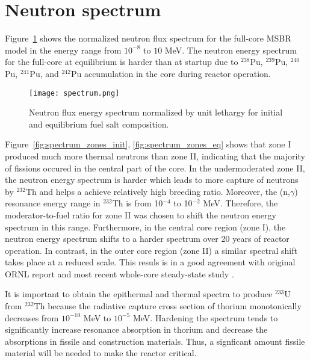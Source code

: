 \section{Neutron spectrum}
Figure~\ref{fig:spectrum} shows the normalized neutron flux spectrum for the full-core \gls{MSBR} model in the energy range from $10^{-8}$ to $10$ MeV. The neutron energy spectrum for the full-core at equilibrium is harder than at startup due to $^{238}$Pu, $^{239}$Pu, $^{240}$Pu, $^{241}$Pu, and $^{242}$Pu accumulation in the core during reactor operation. 

\begin{figure}[htp!] %
  \centering
    \vspace{-0.3em}
  \texttt{[image: spectrum.png]} 
  \caption{Neutron flux energy spectrum normalized by unit lethargy for initial and equilibrium fuel salt composition.}
    \vspace{-0.6em}
  \label{fig:spectrum}
\end{figure}
\FloatBarrier

Figure~\ref{fig:spectrum_zones_init}, \ref{fig:spectrum_zones_eq} shows that zone I produced much more thermal neutrons than zone II, indicating that the majority of fissions occured in the central part of the core. In the undermoderated zone II, the neutron energy spectrum is harder which leads to more capture of neutrons by $^{232}$Th and helps a achieve relatively high breeding ratio. Moreover, the (n,$\gamma$) resonance energy range in $^{232}$Th is from 10$^{-4}$ to 10$^{-2}$ MeV. Therefore, the moderator-to-fuel ratio for zone II was chosen to shift the neutron energy spectrum in this range. Furthermore, in the central core region (zone I), the neutron energy spectrum shifts to a harder spectrum over 20 years of reactor operation. In contrast, in the outer core region (zone II) a similar spectral shift takes place at a reduced scale. This resuls is in a good agreement with original ORNL report \cite{robertson_conceptual_1971} and most recent whole-core steady-state study \cite{park_whole_2015}.

It is important to obtain the epithermal and thermal spectra to produce $^{233}$U from $^{232}$Th because the radiative capture cross section of thorium monotonically decreases from $10^{-10}$ MeV to $10^{-5}$ MeV. Hardening the spectrum tends to significantly increase resonance absorption in thorium and decrease the absorptions in fissile and construction materials. Thus, a signficant amount fissile material will be needed to make the reactor critical. 

